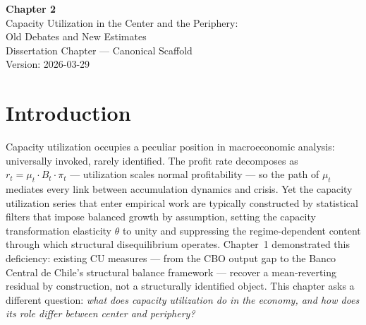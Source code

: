 \documentclass[12pt,letterpaper]{article}
\newcommand{\mut}{\mu_t}           %
\newcommand{\pit}{\pi_t}           %
\newcommand{\Bt}{B_t}              %
\newcommand{\draftnote}[1]{%
  \textcolor{red}{\textbf{[DRAFT PROSE: #1]}}}
\begin{document}
\begin{titlepage}
  \vspace*{2cm}
  \begin{center}
    {\Large \textbf{Chapter 2}}\\[0.5em]
    {\large Capacity Utilization in the Center and the Periphery:\\
    Old Debates and New Estimates}\\[2em]
    {\normalsize Dissertation Chapter — Canonical Scaffold}\\[0.5em]
    {\normalsize Version: 2026-03-29}
  \end{center}
  \vspace{1cm}
  \begin{abstract}
    \draftnote{Abstract: 150--200 words. State: (1)~the structural deficiency
    of existing CU estimates and why it matters for crisis theory; (2)~the
    RRR/CVAR identification strategy and what it recovers; (3)~the behavioral
    recapitalization law and its nested closures; (4)~the Tavares peripheral
    twist as the chapter's distinctive contribution; (5)~the three downstream
    objects inherited by Ch3.}
  \end{abstract}
\end{titlepage}

\doublespacing

\section{Introduction}
\label{sec:intro}
%
%

Capacity utilization occupies a peculiar position in macroeconomic analysis:
universally invoked, rarely identified. The profit rate decomposes as
$r_t = \mut \cdot \Bt \cdot \pit$ --- utilization scales normal profitability
--- so the path of $\mut$ mediates every link between accumulation dynamics and
crisis. Yet the capacity utilization series that enter empirical work are
typically constructed by statistical filters that impose balanced growth by
assumption, setting the capacity transformation elasticity $\theta$ to unity
and suppressing the regime-dependent content through which structural
disequilibrium operates. Chapter~1 demonstrated this deficiency: existing CU
measures --- from the CBO output gap to the Banco Central de Chile's structural
balance framework --- recover a mean-reverting residual by construction, not a
structurally identified object. This chapter asks a different question:
\emph{what does capacity utilization do in the economy, and how does its role
differ between center and periphery?}
\end{document}
